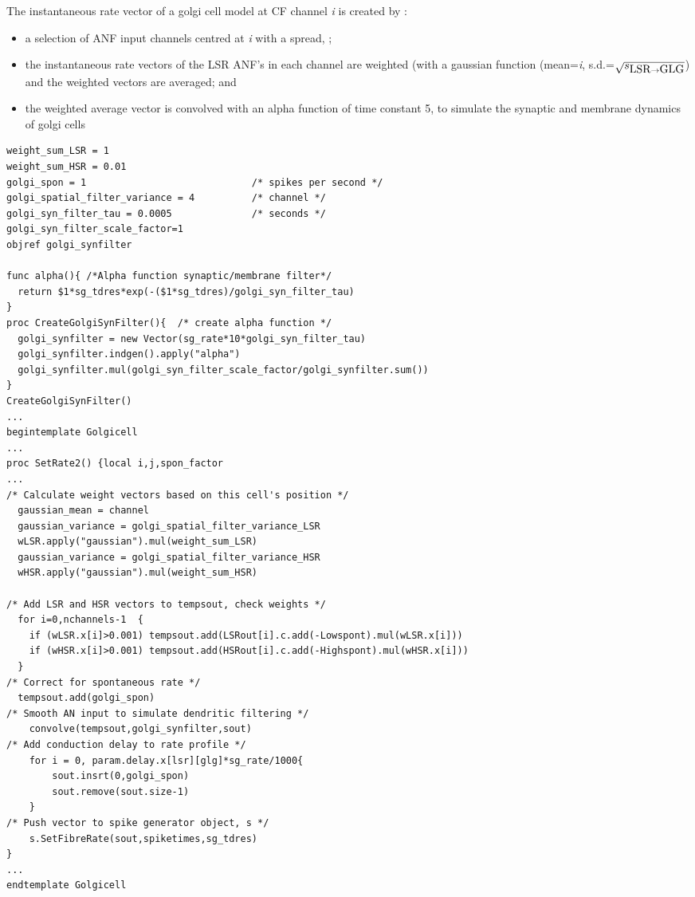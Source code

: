 \begin{appendix}
The instantaneous rate vector of a golgi cell model at CF channel
\emph{i} is created by :
\begin{itemize}
 \item a selection of ANF input channels centred at \emph{i} with a
 spread, \sLSRGLG;
 \item the instantaneous rate vectors of the LSR ANF's in each channel
 are weighted (with a gaussian function (mean=\emph{i},
 s.d.=$\sqrt{\protect s_{\protect\mbox{LSR} \to \mbox{GLG}}}$) and the weighted vectors are averaged; and
 \item the weighted average vector is convolved with an alpha function
 of time constant 5, to simulate the synaptic and membrane dynamics of
 golgi cells
\end{itemize}

 \medskip{}

\begin{lstlisting}[label=GolgiTemplate,caption=Create golgi cell rate vector within Golgi template (in CNcell.tem)]
weight_sum_LSR = 1
weight_sum_HSR = 0.01
golgi_spon = 1                             /* spikes per second */
golgi_spatial_filter_variance = 4          /* channel */
golgi_syn_filter_tau = 0.0005              /* seconds */
golgi_syn_filter_scale_factor=1
objref golgi_synfilter

func alpha(){ /*Alpha function synaptic/membrane filter*/
  return $1*sg_tdres*exp(-($1*sg_tdres)/golgi_syn_filter_tau)
}
proc CreateGolgiSynFilter(){  /* create alpha function */
  golgi_synfilter = new Vector(sg_rate*10*golgi_syn_filter_tau)
  golgi_synfilter.indgen().apply("alpha")  
  golgi_synfilter.mul(golgi_syn_filter_scale_factor/golgi_synfilter.sum()) 
}
CreateGolgiSynFilter()
...
begintemplate Golgicell
...
proc SetRate2() {local i,j,spon_factor
...
/* Calculate weight vectors based on this cell's position */
  gaussian_mean = channel
  gaussian_variance = golgi_spatial_filter_variance_LSR
  wLSR.apply("gaussian").mul(weight_sum_LSR)
  gaussian_variance = golgi_spatial_filter_variance_HSR
  wHSR.apply("gaussian").mul(weight_sum_HSR)

/* Add LSR and HSR vectors to tempsout, check weights */
  for i=0,nchannels-1  {
    if (wLSR.x[i]>0.001) tempsout.add(LSRout[i].c.add(-Lowspont).mul(wLSR.x[i]))
    if (wHSR.x[i]>0.001) tempsout.add(HSRout[i].c.add(-Highspont).mul(wHSR.x[i]))
  }
/* Correct for spontaneous rate */
  tempsout.add(golgi_spon)
/* Smooth AN input to simulate dendritic filtering */
    convolve(tempsout,golgi_synfilter,sout)
/* Add conduction delay to rate profile */
    for i = 0, param.delay.x[lsr][glg]*sg_rate/1000{
        sout.insrt(0,golgi_spon)
        sout.remove(sout.size-1)
    }
/* Push vector to spike generator object, s */
    s.SetFibreRate(sout,spiketimes,sg_tdres)
}
...
endtemplate Golgicell
\end{lstlisting}



\end{appendix}
